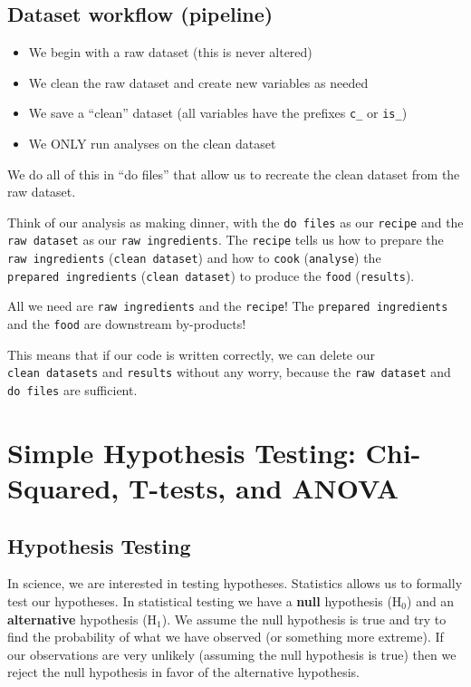 \documentclass[12pt,]{article}
\providecommand{\tightlist}{%
  \setlength{\itemsep}{0pt}\setlength{\parskip}{0pt}}
\begin{document}
\subsection{Dataset workflow
(pipeline)}\label{dataset-workflow-pipeline}

\begin{itemize}
\tightlist
\item
  We begin with a raw dataset (this is never altered)
\item
  We clean the raw dataset and create new variables as needed
\item
  We save a ``clean'' dataset (all variables have the prefixes
  \texttt{c\_} or \texttt{is\_})
\item
  We ONLY run analyses on the clean dataset
\end{itemize}

We do all of this in ``do files'' that allow us to recreate the clean
dataset from the raw dataset.

Think of our analysis as making dinner, with the \texttt{do\ files} as
our \texttt{recipe} and the \texttt{raw\ dataset} as our
\texttt{raw\ ingredients}. The \texttt{recipe} tells us how to prepare
the \texttt{raw\ ingredients} (\texttt{clean\ dataset}) and how to
\texttt{cook} (\texttt{analyse}) the \texttt{prepared\ ingredients}
(\texttt{clean\ dataset}) to produce the \texttt{food}
(\texttt{results}).

All we need are \texttt{raw\ ingredients} and the \texttt{recipe}! The
\texttt{prepared\ ingredients} and the \texttt{food} are downstream
by-products!

This means that if our code is written correctly, we can delete our
\texttt{clean\ datasets} and \texttt{results} without any worry, because
the \texttt{raw\ dataset} and \texttt{do\ files} are sufficient.

\section{Simple Hypothesis Testing: Chi-Squared, T-tests, and
ANOVA}\label{simple-hypothesis-testing-chi-squared-t-tests-and-anova}

\subsection{Hypothesis Testing}\label{hypothesis-testing}

In science, we are interested in testing hypotheses. Statistics allows
us to formally test our hypotheses. In statistical testing we have a
\textbf{null} hypothesis (\(\text{H}_0\)) and an \textbf{alternative}
hypothesis (\(\text{H}_1\)). We assume the null hypothesis is true and
try to find the probability of what we have observed (or something more
extreme). If our observations are very unlikely (assuming the null
hypothesis is true) then we reject the null hypothesis in favor of the
alternative hypothesis.
\end{document}
